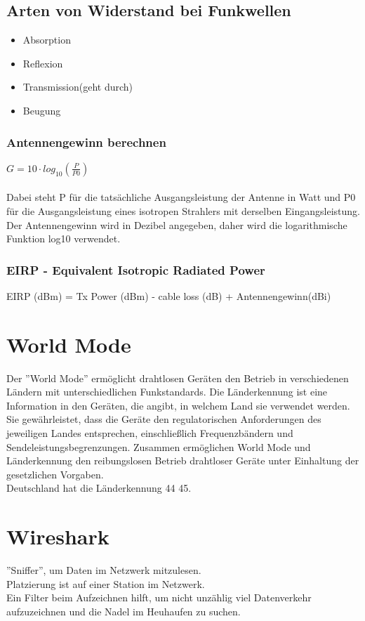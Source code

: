 \documentclass[12pt,a4paper]{article}
\begin{document}
	\subsection{Arten von Widerstand bei Funkwellen}
	\begin{itemize}
		\item Absorption
		\item Reflexion
		\item Transmission(geht durch)
		\item Beugung
	\end{itemize}

	\subsubsection{Antennengewinn berechnen}
		$G = 10 \cdot log_{10}(\frac{P}{P0})$\\\\
		Dabei steht P für die tatsächliche Ausgangsleistung der Antenne in Watt und P0 für die Ausgangsleistung eines isotropen Strahlers mit derselben Eingangsleistung. Der Antennengewinn wird in Dezibel angegeben, daher wird die logarithmische Funktion log10 verwendet.

	\subsubsection{EIRP - Equivalent Isotropic Radiated Power}
		EIRP (dBm) = Tx Power (dBm) - cable loss (dB) + Antennengewinn(dBi)

\section{World Mode}
	Der ''World Mode'' ermöglicht drahtlosen Geräten den Betrieb in verschiedenen Ländern mit unterschiedlichen Funkstandards. Die Länderkennung ist eine Information in den Geräten, die angibt, in welchem Land sie verwendet werden. Sie gewährleistet, dass die Geräte den regulatorischen Anforderungen des jeweiligen Landes entsprechen, einschließlich Frequenzbändern und Sendeleistungsbegrenzungen. Zusammen ermöglichen World Mode und Länderkennung den reibungslosen Betrieb drahtloser Geräte unter Einhaltung der gesetzlichen Vorgaben.\\
	Deutschland hat die Länderkennung 44 45.

\section{Wireshark}
	''Sniffer'', um Daten im Netzwerk mitzulesen.\\
	Platzierung ist auf einer Station im Netzwerk.\\
	Ein Filter beim Aufzeichnen hilft, um nicht unzählig viel Datenverkehr aufzuzeichnen und die Nadel im Heuhaufen zu suchen.
	
\end{document}
